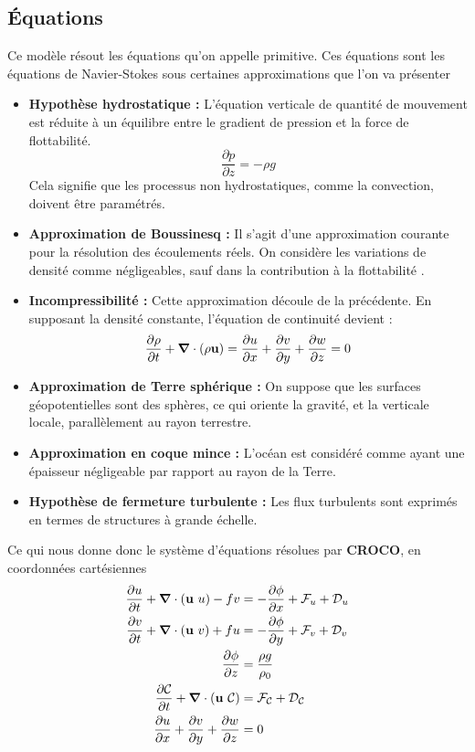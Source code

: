 \subsection{Équations}
Ce modèle résout les équations qu'on appelle primitive. Ces équations sont les équations de Navier-Stokes sous certaines approximations que l'on va présenter 
\begin{itemize}
\item \textbf{Hypothèse hydrostatique :}
L’équation verticale de quantité de mouvement est réduite à un équilibre entre le gradient de pression et la force de flottabilité.
\begin{equation}
\frac{\partial p}{\partial z} = -\rho g
\end{equation}
Cela signifie que les processus non hydrostatiques, comme la convection, doivent être paramétrés.
\item \textbf{Approximation de Boussinesq :}  
      Il s'agit d'une approximation courante pour la résolution des écoulements réels. On considère les variations de densité comme négligeables, sauf dans la contribution à la flottabilité \cite{boussinesq_essai_1877}.  

\item \textbf{Incompressibilité :}  
      Cette approximation découle de la précédente. En supposant la densité constante, l'équation de continuité devient :  
      \begin{equation}  
          \frac{\partial \rho}{\partial t} + \boldsymbol{\nabla} \cdot (\rho \mathbf{u}) = \frac{\partial u}{\partial x} + \frac{\partial v}{\partial y} + \frac{\partial w}{\partial z} = 0  
      \end{equation}  

\item \textbf{Approximation de Terre sphérique :}  
      On suppose que les surfaces géopotentielles sont des sphères, ce qui oriente la gravité, et la verticale locale, parallèlement au rayon terrestre.  

\item \textbf{Approximation en coque mince :}  
      L'océan est considéré comme ayant une épaisseur négligeable par rapport au rayon de la Terre.  

\item \textbf{Hypothèse de fermeture turbulente :}  
      Les flux turbulents sont exprimés en termes de structures à grande échelle.  
\end{itemize}

Ce qui nous donne donc le système d'équations résolues par \textbf{CROCO}, en coordonnées cartésiennes
\begin{subequations}
\begin{align}
	\frac{\partial u}{\partial t} + \boldsymbol{\nabla} \cdot (\mathbf{u} \ u) - fv & = - \frac{\partial \phi}{\partial x} + \mathcal{F}_u + \mathcal{D}_u \\
	\frac{\partial v}{\partial t} + \boldsymbol{\nabla} \cdot (\mathbf{u} \ v) + fu & = - \frac{\partial \phi}{\partial y} + \mathcal{F}_v + \mathcal{D}_v \\
	\frac{\partial \phi}{\partial z} & = \frac{\rho g}{\rho_0} \\
	\frac{\partial \mathcal{C}}{\partial t} + \boldsymbol{\nabla} \cdot (\mathbf{u} \ \mathcal{C}) & = \mathcal{F}_\mathcal{C} + \mathcal{D}_\mathcal{C} \\
	\frac{\partial u}{\partial x} + \frac{\partial v}{\partial y} + \frac{\partial w}{\partial z} & = 0  
\end{align}
\end{subequations}


